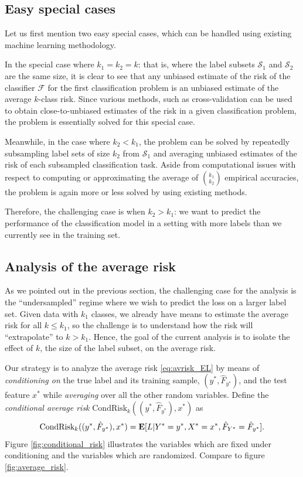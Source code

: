 \documentclass[12pt]{article}
\begin{document}
\subsection{Easy special cases}

Let us first mention two easy special cases, which can be handled
using existing machine learning methodology.

In the special case where $k_1 = k_2 = k$: that is, where the label
subsets $\mathcal{S}_1$ and $\mathcal{S}_2$ are the same size, it is
clear to see that any unbiased estimate of the risk of the classifier
$\mathcal{F}$ for the first classification problem is an unbiased
estimate of the average $k$-class risk.  Since various methods, such
as cross-validation can be used to obtain close-to-unbiased estimates
of the risk in a given classification problem, the problem is
essentially solved for this special case.

Meanwhile, in the case where $k_2 < k_1$, the problem can be solved by
repeatedly subsampling label sets of size $k_2$ from $\mathcal{S}_1$
and averaging unbiased estimates of the risk of each subsampled
classification task.  Aside from computational issues with respect to
computing or approximating the average of ${k_1}\choose{k_2}$
empirical accuracies, the problem is again more or less solved by
using existing methods.

Therefore, the challenging case is when $k_2 > k_1$: we want to
predict the performance of the classification model in a setting with
more labels than we currently see in the training set.

\subsection{Analysis of the average risk}

As we pointed out in the previous section, the challenging case for
the analysis is the ``undersampled'' regime where we wish to predict
the loss on a larger label set.  Given data with $k_1$ classes, we
already have means to estimate the average risk for all $k \leq k_1$,
so the challenge is to understand how the risk will ``extrapolate'' to
$k > k_1$.  Hence, the goal of the current analysis is to isolate the
effect of $k$, the size of the label subset, on the average risk.

Our strategy is to analyze the average risk \eqref{eq:avrisk_EL} by
means of \emph{conditioning on} the true label and its training
sample, $(y^*, \hat{F}_{y^*})$, and the test feature $x^*$
while \emph{averaging} over all the other random variables.  Define
the \emph{conditional average risk} $\text{CondRisk}_k((y^*, \hat{F}_{y^*}), x^*)$ as
\[
\text{CondRisk}_k((y^*, \hat{F}_{y^*}), x^*) = \textbf{E}[L|Y^*=y^*, X^* = x^*, \hat{F}_{Y^*} = \hat{F}_{y^*}].
\]
Figure \ref{fig:conditional_risk} illustrates the variables which are
fixed under conditioning and the variables which are randomized.
Compare to figure \ref{fig:average_risk}.
\end{document}
